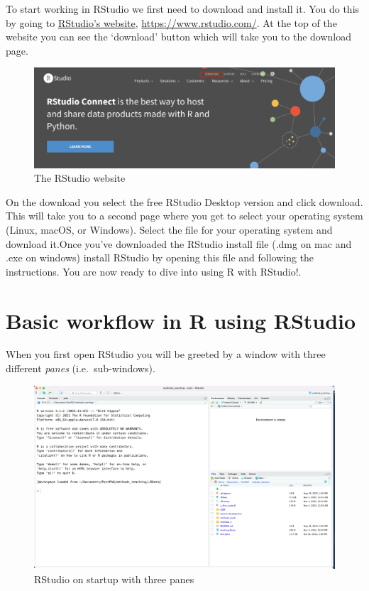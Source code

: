 \documentclass[
]{book}
\begin{document}
To start working in RStudio we first need to download and install it. You do this by going to \href{https://www.rstudio.com/}{RStudio's website}, \url{https://www.rstudio.com/}. At the top of the website you can see the `download' button which will take you to the download page.

\begin{figure}
\centering
\includegraphics{figures/rstudio.png}
\caption{The RStudio website}
\end{figure}

On the download you select the free RStudio Desktop version and click download. This will take you to a second page where you get to select your operating system (Linux, macOS, or Windows). Select the file for your operating system and download it.Once you've downloaded the RStudio install file (.dmg on mac and .exe on windows) install RStudio by opening this file and following the instructions. You are now ready to dive into using R with RStudio!.

\hypertarget{basic-workflow-in-r-using-rstudio}{%
\chapter{Basic workflow in R using RStudio}\label{basic-workflow-in-r-using-rstudio}}

When you first open RStudio you will be greeted by a window with three different \emph{panes} (i.e.~sub-windows).

\begin{figure}
\centering
\includegraphics{figures/three_pane.png}
\caption{RStudio on startup with three panes}
\end{figure}
\end{document}
